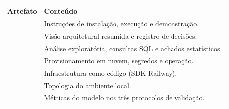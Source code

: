 \begin{tabularx}{\linewidth}{@{}L{38mm}X@{}}
  \toprule
  \textbf{Artefato} & \textbf{Conteúdo}\\
  \midrule
   & Instruções de instalação, execução e demonstração.\\
   & Visão arquitetural resumida e registro de decisões.\\
   & Análise exploratória, consultas SQL e achados
       estatísticos.\\
   & Provisionamento em nuvem, segredos e operação.\\
   & Infraestrutura como código (SDK Railway).\\
   & Topologia do ambiente local.\\
   & Métricas do modelo nos três protocolos de
       validação.\\
  \bottomrule
\end{tabularx}
